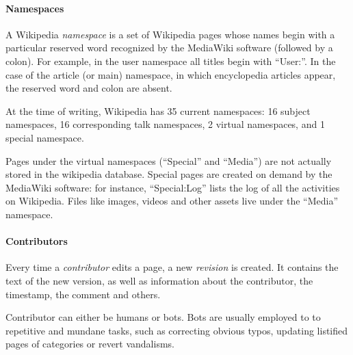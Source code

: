 \paragraph{Namespaces}
A Wikipedia \emph{namespace} is a set of Wikipedia pages whose names begin with a particular reserved word recognized by the MediaWiki software (followed by a colon).
For example, in the user namespace all titles begin with ``User:''.
In the case of the article (or main) namespace, in which encyclopedia articles appear, the reserved word and colon are absent.

At the time of writing, Wikipedia has 35 current namespaces: 16 subject namespaces, 16 corresponding talk namespaces, 2 virtual namespaces, and 1 special namespace.

Pages under the virtual namespaces (``Special'' and ``Media'') are not actually stored in the wikipedia database.
Special pages are created on demand by the MediaWiki software: for instance, ``Special:Log'' lists the log of all the activities on Wikipedia.
Files like images, videos and other assets live under the ``Media'' namespace.

\paragraph{Contributors}
Every time a \emph{contributor} edits a page, a new \emph{revision} is created.
It contains the text of the new version, as well as information about the contributor, the timestamp, the comment and others.

Contributor can either be humans or bots.
Bots are usually employed to to repetitive and mundane tasks, such as correcting obvious typos, updating listified pages of categories or revert vandalisms.

